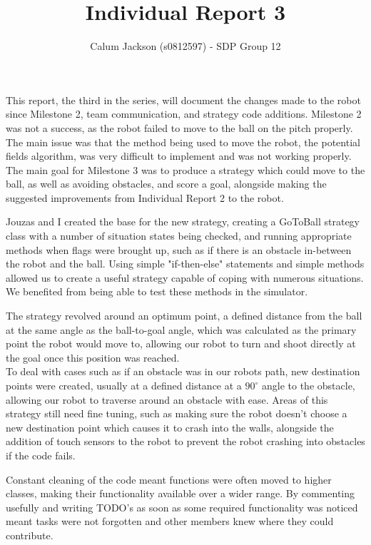 \documentclass[12pt]{article}
\begin{document}
\title{Individual Report 3}
\author{Calum Jackson (s0812597) - 
SDP Group 12}
\maketitle
\begin{flushleft}

This report, the third in the series, will document the changes made to the robot since Milestone 2, team communication, and strategy code additions. Milestone 2 was not a success, as the robot failed to move to the ball on the pitch properly. The main issue was that the method being used to move the robot, the potential fields algorithm, was very difficult to implement and was not working properly. The main goal for Milestone 3 was to produce a strategy which could move to the ball, as well as avoiding obstacles, and score a goal, alongside making the suggested improvements from Individual Report 2 to the robot.\linebreak


Jouzas and I created the base for the new strategy, creating a GoToBall strategy class with a number of situation states being checked, and running appropriate methods when flags were brought up, such as if there is an obstacle in-between the robot and the ball. Using simple "if-then-else" statements and simple methods allowed us to create a useful strategy capable of coping with numerous situations. We benefited from being able to test these methods in the simulator.\linebreak

The strategy revolved around an optimum point, a defined distance from the ball at the same angle as the ball-to-goal angle, which was calculated as the primary point the robot would move to, allowing our robot to turn and shoot directly at the goal once this position was reached.\\

To deal with cases such as if an obstacle was in our robots path, new destination points were created, usually at a defined distance at a $90^{\circ}$ angle to the obstacle, allowing our robot to traverse around an obstacle with ease.  Areas of this strategy still need fine tuning, such as making sure the robot doesn't choose a new destination point which causes it to crash into the walls, alongside the addition of touch sensors to the robot to prevent the robot crashing into obstacles if the code fails. \linebreak

Constant cleaning of the code meant functions were often moved to higher classes, making their functionality available over a wider range. By commenting usefully and writing TODO's as soon as some required functionality was noticed meant tasks were not forgotten and other members knew where they could contribute. \linebreak



\end{flushleft}
\end{document}
